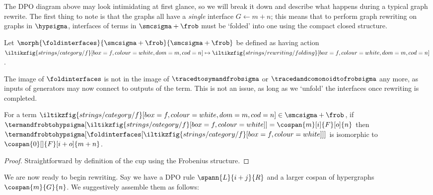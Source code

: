 The DPO diagram above may look intimidating at first glance, so we will
break it down and describe what happens during a typical graph rewrite.
The first thing to note is that the graphs all have a \emph{single} interface
\(G \leftarrow m + n\); this means that to perform graph rewriting on graphs in
\(\hypsigma\), interfaces of terms in \(\smcsigma + \frob\) must be `folded'
into one using the compact closed structure.

\begin{definition}\label{def:fold-interfaces}
    Let \(\morph{\foldinterfaces}{\smcsigma + \frob}{\smcsigma + \frob}\)
    be defined as having action \(
    \iltikzfig{strings/category/f}[box=f,colour=white,dom=m,cod=n]
    \mapsto
    \iltikzfig{strings/rewriting/folding}[box=f,colour=white,dom=m,cod=n]
    \).
\end{definition}

The image of \(\foldinterfaces\) is not in the image of
\(\tracedtosymandfrobsigma\) or \(\tracedandcomonoidtofrobsigma\) any more,
as inputs of generators may now connect to outputs of the term.
This is not an issue, as long as we `unfold' the interfaces once rewriting is
completed.

\begin{proposition}
    For a term \(
    \iltikzfig{strings/category/f}[box=f,colour=white,dom=m,cod=n]
    \in
    \smcsigma + \frob
    \), if \(
    \termandfrobtohypsigma[\iltikzfig{strings/category/f}[box=f,colour=white]]
    =
    \cospan{m}[i]{F}[o]{n}
    \) then \(
    \termandfrobtohypsigma[
        \foldinterfaces[
            \iltikzfig{strings/category/f}[box=f,colour=white]
        ]
    ]
    \) is isomorphic to \(
    \cospan{0}[]{F}[i+o]{m + n}
    \).
\end{proposition}
\begin{proof}
    Straightforward by definition of the cup using the Frobenius structure.
\end{proof}

We are now ready to begin rewriting.
Say we have a DPO rule \(\spann{L}{i + j}{R}\) and a larger cospan of
hypergraphs \(\cospan{m}{G}{n}\).
We suggestively assemble them as follows:

\begin{center}
\end{center}

